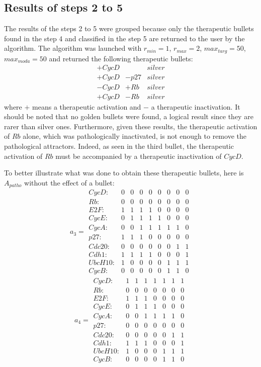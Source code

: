 \documentclass[oneside,a4paper,onecolumn,notitlepage]{article}
\begin{document}
\subsection{Results of steps 2 to 5}
The results of the steps 2 to 5 were grouped because only the therapeutic bullets found in the step 4 and classified in the step 5 are returned to the user by the algorithm. The algorithm was launched with $r_{min}=1$, $r_{max}=2$, $max_{targ}=50$, $max_{moda}=50$ and returned the following therapeutic bullets:
\begin{equation*}
\begin{matrix}
+CycD&&silver\\
+CycD&-p27&silver\\
-CycD&+Rb&silver\\
+CycD&-Rb&silver
\end{matrix}
\end{equation*}
where $+$ means a therapeutic activation and $-$ a therapeutic inactivation. It should be noted that no golden bullets were found, a logical result since they are rarer than silver ones. Furthermore, given these results, the therapeutic activation of $Rb$ alone, which was pathologically inactivated, is not enough to remove the pathological attractors. Indeed, as seen in the third bullet, the therapeutic activation of $Rb$ must be accompanied by a therapeutic inactivation of $CycD$.

To better illustrate what was done to obtain these therapeutic bullets, here is $A_{patho}$ without the effect of a bullet:
\begin{equation*}
a_{3}=
\begin{matrix}
CycD:&0&0&0&0&0&0&0&0\\
Rb:&0&0&0&0&0&0&0&0\\
E2F:&1&1&1&1&0&0&0&0\\
CycE:&0&1&1&1&1&0&0&0\\
CycA:&0&0&1&1&1&1&1&0\\
p27:&1&1&1&0&0&0&0&0\\
Cdc20:&0&0&0&0&0&0&1&1\\
Cdh1:&1&1&1&1&0&0&0&1\\
UbcH10:&1&0&0&0&0&1&1&1\\
CycB:&0&0&0&0&0&1&1&0
\end{matrix}
\end{equation*}
\begin{equation*}
a_{4}=
\begin{matrix}
CycD:&1&1&1&1&1&1&1\\
Rb:&0&0&0&0&0&0&0\\
E2F:&1&1&1&0&0&0&0\\
CycE:&0&1&1&1&0&0&0\\
CycA:&0&0&1&1&1&1&0\\
p27:&0&0&0&0&0&0&0\\
Cdc20:&0&0&0&0&0&1&1\\
Cdh1:&1&1&1&0&0&0&1\\
UbcH10:&1&0&0&0&1&1&1\\
CycB:&0&0&0&0&1&1&0
\end{matrix}
\end{equation*}
\end{document}
